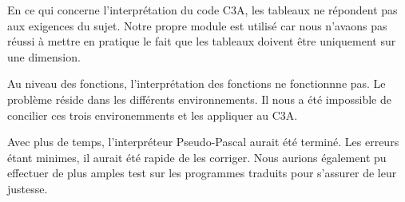 \documentclass[10pt,a4paper]{article}
\begin{document}
En ce qui concerne l'interprétation du code C3A, les tableaux ne répondent pas aux exigences du sujet. Notre propre module est utilisé car nous n'avaons pas réussi à mettre en pratique le fait que les tableaux doivent être uniquement sur une dimension.

Au niveau des fonctions, l'interprétation des fonctions ne fonctionnne pas. Le problème réside dans les différents environnements. Il nous a été impossible de concilier ces trois environemments et les appliquer au C3A.

Avec plus de temps, l'interpréteur Pseudo-Pascal aurait été terminé. Les erreurs étant minimes, il aurait été rapide de les corriger. Nous aurions également pu effectuer de plus amples test sur les programmes traduits pour s'assurer de leur justesse.  
\end{document}
